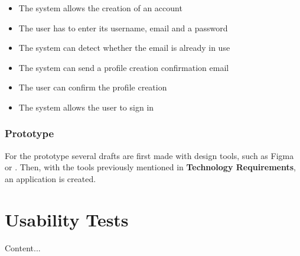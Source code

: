 \begin{itemize}
    \item The system allows the creation of an account
    \item The user has to enter its username, email and a password
    \item The system can detect whether the email is already in use
    \item The system can send a profile creation confirmation email
    \item The user can confirm the profile creation
    \item The system allows the user to sign in
\end{itemize}

\subsubsection*{Prototype}

For the prototype several drafts are first made with design tools, such as Figma or . Then,
with the tools previously mentioned in \textbf{Technology Requirements}, an application is created.

\section*{Usability Tests}
\label{appendix:usability_tests}

Content...
